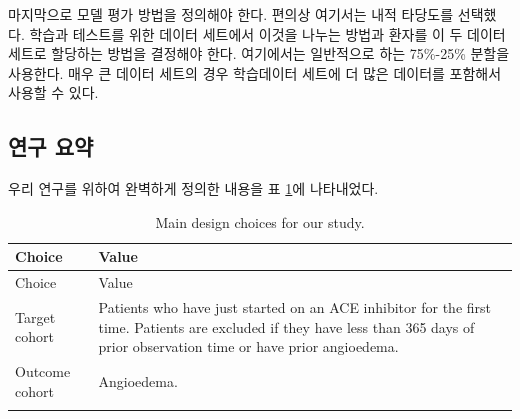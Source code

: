 \documentclass[11pt]{book}
\theoremstyle{definition}
\theoremstyle{definition}
\theoremstyle{definition}
\theoremstyle{remark}
\begin{document}
마지막으로 모델 평가 방법을 정의해야 한다. 편의상 여기서는 내적 타당도를
선택했다. 학습과 테스트를 위한 데이터 세트에서 이것을 나누는 방법과
환자를 이 두 데이터 세트로 할당하는 방법을 결정해야 한다. 여기에서는
일반적으로 하는 75\%-25\% 분할을 사용한다. 매우 큰 데이터 세트의 경우
학습데이터 세트에 더 많은 데이터를 포함해서 사용할 수 있다.

\subsection{연구 요약}\label{--1}

우리 연구를 위하여 완벽하게 정의한 내용을 표 \ref{tab:plpSummary}에
나타내었다.

\begin{longtable}[]{@{}ll@{}}
\caption{\label{tab:plpSummary} Main design choices for our
study.}\tabularnewline
\toprule
\begin{minipage}[b]{0.23\columnwidth}\raggedright\strut
Choice\strut
\end{minipage} & \begin{minipage}[b]{0.71\columnwidth}\raggedright\strut
Value\strut
\end{minipage}\tabularnewline
\midrule
\endfirsthead
\toprule
\begin{minipage}[b]{0.23\columnwidth}\raggedright\strut
Choice\strut
\end{minipage} & \begin{minipage}[b]{0.71\columnwidth}\raggedright\strut
Value\strut
\end{minipage}\tabularnewline
\midrule
\endhead
\begin{minipage}[t]{0.23\columnwidth}\raggedright\strut
Target cohort\strut
\end{minipage} & \begin{minipage}[t]{0.71\columnwidth}\raggedright\strut
Patients who have just started on an ACE inhibitor for the first time.
Patients are excluded if they have less than 365 days of prior
observation time or have prior angioedema.\strut
\end{minipage}\tabularnewline
\begin{minipage}[t]{0.23\columnwidth}\raggedright\strut
Outcome cohort\strut
\end{minipage} & \begin{minipage}[t]{0.71\columnwidth}\raggedright\strut
Angioedema.\strut
\end{minipage}\tabularnewline
\begin{minipage}[t]{0.23\columnwidth}\raggedright\strut

\end{minipage}
\end{longtable}
\end{document}
